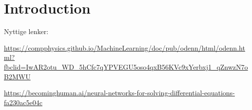 \section{Introduction}\label{sec:Introduction}

Nyttige lenker:

\url{https://compphysics.github.io/MachineLearning/doc/pub/odenn/html/odenn.html?fbclid=IwAR2otu_WD_5hCfc7qYPVEGU5oso4qxB56KVc9xYerbxj1_qZnwzN7oB2MWU}

\url{https://becominghuman.ai/neural-networks-for-solving-differential-equations-fa230ac5e04c}
